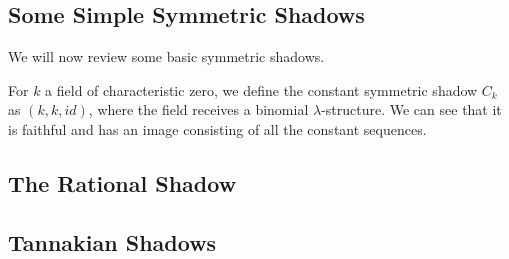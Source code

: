 \subsection{Some Simple Symmetric Shadows}
We will now review some basic symmetric shadows.

\begin{definition}
  For $k$ a field of characteristic zero, we define the constant symmetric shadow $C_k$ as $(k, k, id)$, where the field receives a binomial $\lambda$-structure. We can see that it is faithful and has an image consisting of all the constant sequences.
\end{definition}

\subsection{The Rational Shadow}

\subsection{Tannakian Shadows}
